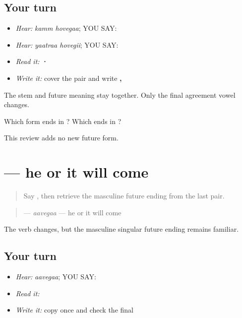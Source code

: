 \subsection*{Your turn}
\begin{itemize}
\raggedright
  \item \emph{Hear:} \emph{kamm hovegaa}; YOU SAY: \textbf{ }
  \item \emph{Hear:} \emph{yaatraa hovegii}; YOU SAY: \textbf{ }
  \item \emph{Read it:} \textbf{ · }
  \item \emph{Write it:} cover the pair and write \textbf{, }
\end{itemize}

The stem and future meaning stay together. Only the final agreement vowel changes.

\begin{tcolorbox}[breakable,colback=teal!4,colframe=teal!35!black,title={Before you move on}]
Which form ends in \textbf{}? Which ends in \textbf{}?

This review adds no new future form.
\end{tcolorbox}
\section[\texorpdfstring{\pa{ਆਵੇਗਾ} (aavegaa)}{ਆਵੇਗਾ (aavegaa)}]{ — he or it will come}

\label{lesson:PA-C186-aavega}



\begin{quote}
Say \textbf{}, then retrieve the masculine future ending from the last pair.
\end{quote}

\begin{grammarlens}[title={Grammar Lens: transfer the masculine future}]
\begin{quote}
\textbf{} — \emph{aavegaa} — he or it will come
\end{quote}

The verb changes, but the masculine singular future ending remains familiar.
\end{grammarlens}

\subsection*{Your turn}
\begin{itemize}
\raggedright
  \item \emph{Hear:} \emph{aavegaa}; YOU SAY: \textbf{}
  \item \emph{Read it:} \textbf{ }
  \item \emph{Write it:} copy \textbf{} once and check the final \textbf{}
\end{itemize}

